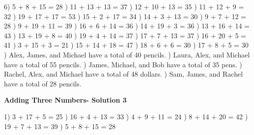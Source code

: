 \documentclass{article}%
\begin{document}
6) 5 + 8 + 15 = 28%
) 11 + 13 + 13 = 37%
) 12 + 10 + 13 = 35%
) 11 + 12 + 9 = 32%
) 19 + 17 + 17 = 53%
) 15 + 2 + 17 = 34%
) 14 + 3 + 13 = 30%
) 9 + 7 + 12 = 28%
) 9 + 19 + 11 = 39%
) 16 + 6 + 14 = 36%
) 14 + 19 + 3 = 36%
) 13 + 16 + 14 = 43%
) 13 + 19 + 8 = 40%
) 19 + 4 + 14 = 37%
) 17 + 7 + 13 = 37%
) 16 + 20 + 5 = 41%
) 3 + 15 + 3 = 21%
) 15 + 14 + 18 = 47%
) 18 + 6 + 6 = 30%
) 17 + 8 + 5 = 30%
) Alex, James, and Michael have a total of 40 pencils.%
) Laura, Alex, and Michael have a total of 55 pencils.%
) James, Michael, and Bob have a total of 35 pens.%
) Rachel, Alex, and Michael have a total of 48 dollars.%
) Sam, James, and Rachel have a total of 28 pencils.%
\newline%
\newpage%
\large%
\begin{center}%
\textbf{Adding Three Numbers- Solution 3}%
\newline%
\end{center} \normalsize%
1) 3 + 17 + 5 = 25%
) 16 + 4 + 13 = 33%
) 4 + 9 + 11 = 24%
) 8 + 14 + 20 = 42%
) 19 + 7 + 13 = 39%
) 5 + 8 + 15 = 28%
\newline%
\end{document}

